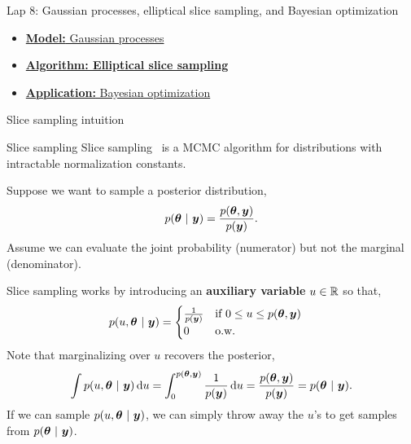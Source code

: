 \documentclass[aspectratio=169]{beamer}
\begin{document}
\begin{frame}{Lap 8: Gaussian processes, elliptical slice sampling, and Bayesian optimization}
\begin{itemize}
    \item \hyperref[sec:gps]{\textbf{Model:} Gaussian processes}
    \item \hyperref[sec:ess]{\textbf{Algorithm: Elliptical slice sampling}}
    \item \hyperref[sec:bopt]{\textbf{Application:} Bayesian optimization}
\end{itemize}
\end{frame}

\begin{frame}{Slice sampling intuition}
    
\end{frame}

\begin{frame}{Slice sampling}
Slice sampling~\citep{Neal2003-zu} is a MCMC algorithm for distributions with intractable normalization constants. 

Suppose we want to sample a posterior distribution,
\begin{align}
    p(\boldsymbol{\theta} ~\vert~ \boldsymbol{y}) = \frac{p(\boldsymbol{\theta}, \boldsymbol{y})}{p(\boldsymbol{y})}.
\end{align}
Assume we can evaluate the joint probability (numerator) but not the marginal (denominator). 

Slice sampling works by introducing an \textbf{auxiliary variable} $u \in \mathbb{R}$ so that,
\begin{align}
    p(u, \boldsymbol{\theta} ~\vert~ \boldsymbol{y}) &= 
    \begin{cases}
    \frac{1}{p(\boldsymbol{y})} & \text{if } 0 \leq u \leq p(\boldsymbol{\theta}, \boldsymbol{y}) \\
    0 & \text{o.w.}
    \end{cases}
\end{align}
Note that marginalizing over $u$ recovers the posterior, 
\begin{align}
    \int p(u, \boldsymbol{\theta} ~\vert~ \boldsymbol{y}) \mathop{}\!\mathrm{d} u = \int_0^{p(\boldsymbol{\theta}, \boldsymbol{y})} \frac{1}{p(\boldsymbol{y})} \mathop{}\!\mathrm{d} u = \frac{p(\boldsymbol{\theta}, \boldsymbol{y})}{p(\boldsymbol{y})} = p(\boldsymbol{\theta} ~\vert~ \boldsymbol{y}).
\end{align}
If we can sample $p(u, \boldsymbol{\theta} ~\vert~ \boldsymbol{y})$, we can simply throw away the $u$'s to get samples from $p(\boldsymbol{\theta} ~\vert~ \boldsymbol{y})$.
\end{frame}
\end{document}
